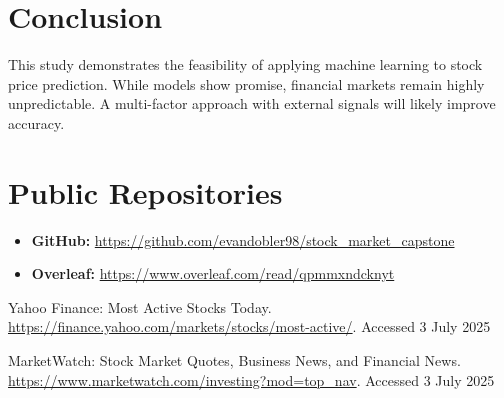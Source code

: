 \documentclass[runningheads]{llncs}
\begin{document}
\section{Conclusion}
This study demonstrates the feasibility of applying machine learning to stock price prediction. While models show promise, financial markets remain highly unpredictable. A multi-factor approach with external signals will likely improve accuracy.

\section*{Public Repositories}
\begin{itemize}
    \item \textbf{GitHub:} \url{https://github.com/evandobler98/stock_market_capstone}
    \item \textbf{Overleaf:} \url{https://www.overleaf.com/read/qpmmxndcknyt}
\end{itemize}

\begin{thebibliography}{2}

Yahoo Finance: Most Active Stocks Today.\\
\url{https://finance.yahoo.com/markets/stocks/most-active/}. Accessed 3 July 2025

MarketWatch: Stock Market Quotes, Business News, and Financial News.\\
\url{https://www.marketwatch.com/investing?mod=top_nav}. Accessed 3 July 2025

\end{thebibliography}
\end{document}
